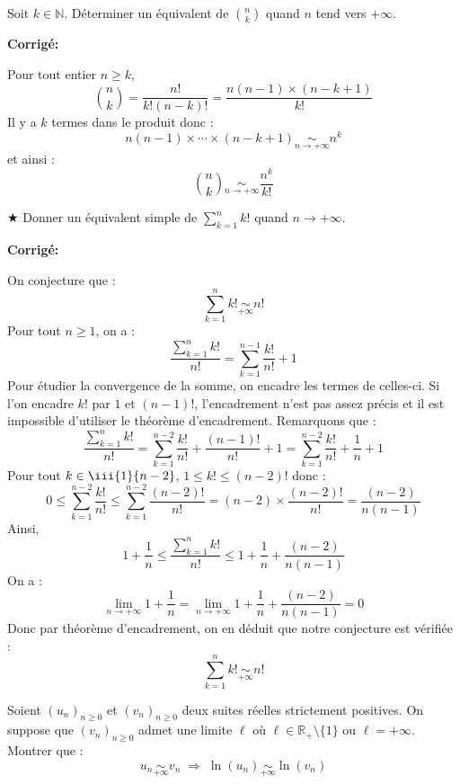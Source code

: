 \documentclass[a4paper,twoside,french,10pt]{VcCours}
\newcommand{\corr}{\textbf{Corrigé:}}
\begin{document}
\medskip


\begin{Exercice}{} Soit $k \in \mathbb{N}$. Déterminer un équivalent de $\binom{n}{k}$ quand $n$ tend vers $+ \infty$. 
\end{Exercice}

\corr

Pour tout entier $n \geq k$,
$$ \binom{n}{k} = \dfrac{n!}{k!(n-k)!} = \dfrac{n(n-1)\times (n-k+1)}{k!}$$
Il y a $k$ termes dans le produit donc :
$$ n(n-1)\times \cdots \times (n-k+1) \underset{n \rightarrow + \infty}{\sim} n^k$$
et ainsi :
$$  \binom{n}{k} \underset{n \rightarrow+ \infty}{\sim} \dfrac{n^k}{k!}$$

\medskip

\begin{Exercice}{$\bigstar$} Donner un équivalent simple de $\sum_{k=1}^n k!$ quand $n \rightarrow + \infty$.
\end{Exercice} 

\corr

On conjecture que :
$$ \sum_{k=1}^n k! \underset{+ \infty}{\sim} n! $$
Pour tout $n \geq 1$, on a :
$$\dfrac{\sum_{k=1}^n k!}{n!}  = \sum_{k=1}^{n-1} \dfrac{k!}{n!} + 1 $$
Pour étudier la convergence de la somme, on encadre les termes de celles-ci. Si l'on encadre $k!$ par $1$ et $(n-1)!$, l'encadrement n'est pas assez précis et il est impossible d'utiliser le théorème d'encadrement. Remarquons que :
$$ \dfrac{\sum_{k=1}^n k!}{n!}  = \sum_{k=1}^{n-2} \dfrac{k!}{n!} + \dfrac{(n-1)!}{n!} + 1 = \sum_{k=1}^{n-2} \dfrac{k!}{n!} + \dfrac{1}{n} + 1 $$
Pour tout $k \in \iii{1}{n-2}$, $1 \leq k! \leq (n-2)!$ donc :
$$ 0 \leq \sum_{k=1}^{n-2} \dfrac{k!}{n!} \leq \sum_{k=1}^{n-2} \dfrac{(n-2)!}{n!} = (n-2) \times \dfrac{(n-2)!}{n!} = \dfrac{(n-2)}{n(n-1)}$$
Ainsi,
$$ 1+ \dfrac{1}{n} \leq \dfrac{\sum_{k=1}^n k!}{n!} \leq 1 + \dfrac{1}{n} + \dfrac{(n-2)}{n(n-1)}$$
On a :
$$ \lim_{n \rightarrow + \infty} 1+ \dfrac{1}{n} =  \lim_{n \rightarrow + \infty} 1+ \dfrac{1}{n} + \dfrac{(n-2)}{n(n-1)} = 0$$
Donc par théorème d'encadrement, on en déduit que notre conjecture est vérifiée :
$$ \sum_{k=1}^n k! \underset{+ \infty}{\sim} n! $$

\medskip


\begin{Exercice}{}\label{log} Soient $(u_n)_{n \geq 0}$ et $(v_n)_{n \geq 0}$ deux suites réelles strictement positives. On suppose que $(v_n)_{n \geq 0}$ admet une limite $\ell$ où $\ell \in \mathbb{R}_+\setminus \lbrace 1 \rbrace$ ou $\ell= + \infty$. Montrer que :
$$ u_n \underset{+ \infty}{\sim} v_n \; \Longrightarrow  \; \ln(u_n) \underset{+ \infty}{\sim} \ln(v_n)$$
\end{Exercice}
\end{document}
